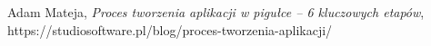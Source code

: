 \begin{thebibliography}{9}
\small
{}
Adam Mateja, \emph{Proces tworzenia aplikacji w pigułce – 6 kluczowych etapów}, https://studiosoftware.pl/blog/proces-tworzenia-aplikacji/
\end{thebibliography}
